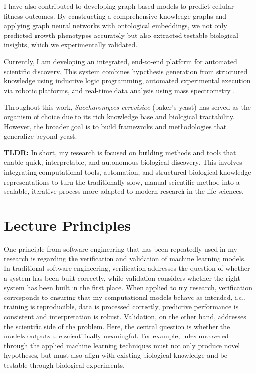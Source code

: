 \documentclass[11pt,compsoc,a4paper]{IEEEtran}
\begin{document}
I have also contributed to developing graph-based models to predict cellular fitness outcomes. By constructing a comprehensive knowledge graphs and applying graph neural networks with ontological embeddings, we not only predicted growth phenotypes accurately but also extracted testable biological insights, which we experimentally validated.

Currently, I am developing an integrated, end-to-end platform for automated scientific discovery. This system combines hypothesis generation from structured knowledge using inductive logic programming, automated experimental execution via robotic platforms, and real-time data analysis using mass spectrometry \cite{brunnsaker2025agentic}. 

Throughout this work, \textit{Saccharomyces cerevisiae} (baker's yeast) has served as the organism of choice due to its rich knowledge base and biological tractability. However, the broader goal is to build frameworks and methodologies that generalize beyond yeast.

\noindent \textbf{TLDR:} In short, my research is focused on building methods and tools that enable quick, interpretable, and autonomous biological discovery. This involves integrating computational tools, automation, and structured biological knowledge representations to turn the traditionally slow, manual scientific method into a scalable, iterative process more adapted to modern research in the life sciences.

\section{Lecture Principles}

    One principle from software engineering that has been repeatedly used in my research is regarding the verification and validation of machine learning models. In traditional software engineering, verification addresses the question of whether a system has been built correctly, while validation considers whether the right system has been built in the first place. When applied to my research, verification corresponds to ensuring that my computational models behave as intended, i.e., training is reproducible, data is processed correctly, predictive performance is consistent and interpretation is robust. Validation, on the other hand, addresses the scientific side of the problem. Here, the central question is whether the models outputs are scientifically meaningful. For example, rules uncovered through the applied machine learning techniques must not only produce novel hypotheses, but must also align with existing biological knowledge and be testable through biological experiments. 
\end{document}

